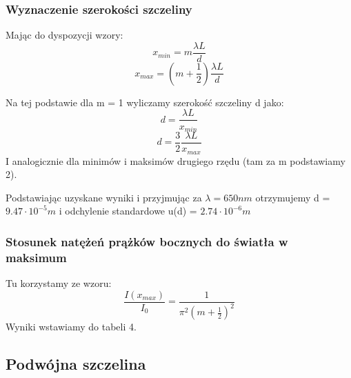 \documentclass{article}
\begin{document}
\subsubsection{Wyznaczenie szerokości szczeliny}
Mając do dyspozycji wzory:
\begin{equation}
x_{min} = m \frac{\lambda L}{d}
\end{equation}
\begin{equation}
x_{max} = (m+\frac{1}{2}) \frac{\lambda L}{d}
\end{equation}

Na tej podstawie dla m = 1 wyliczamy szerokość szczeliny d jako:
\begin{equation}
d = \frac{\lambda L}{x_{min}}
\end{equation}
\begin{equation}
d = \frac{3}{2} \frac{\lambda L}{x_{max}}
\end{equation}
I analogicznie dla minimów i maksimów drugiego rzędu (tam za m podstawiamy 2).

Podstawiając uzyskane wyniki i przyjmując za $\lambda = 650 nm$ otrzymujemy d = $9.47 \cdot 10^{-5} m$ i odchylenie standardowe u(d) = $2.74  \cdot 10^{-6} m$
\subsubsection{Stosunek natężeń prążków bocznych do światła w maksimum}
Tu korzystamy ze wzoru:
\begin{equation}
	\frac{I(x_{max})}{I_{0}} = \frac{1}{\pi^{2}(m+\frac{1}{2})^{2}}
\end{equation}
Wyniki wstawiamy do tabeli 4.

\subsection{Podwójna szczelina}
\end{document}
